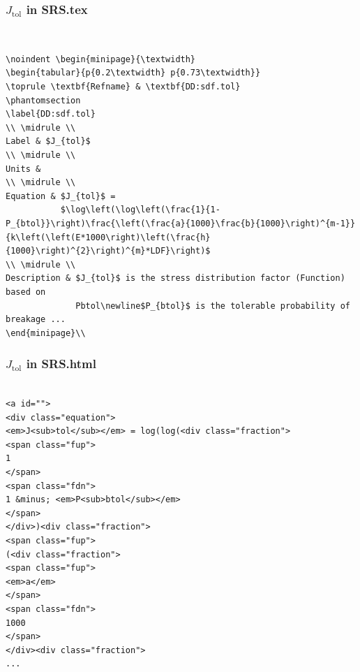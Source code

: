\documentclass[t,12pt,numbers,fleqn]{beamer}
\begin{document}

\begin{frame}

\frametitle{$J_{\mbox{tol}}$ in SRS.tex}
~\\
\begin{lstlisting}
\noindent \begin{minipage}{\textwidth}
\begin{tabular}{p{0.2\textwidth} p{0.73\textwidth}}
\toprule \textbf{Refname} & \textbf{DD:sdf.tol}
\phantomsection 
\label{DD:sdf.tol}
\\ \midrule \\
Label & $J_{tol}$
\\ \midrule \\
Units & 
\\ \midrule \\
Equation & $J_{tol}$ =
           $\log\left(\log\left(\frac{1}{1-P_{btol}}\right)\frac{\left(\frac{a}{1000}\frac{b}{1000}\right)^{m-1}}{k\left(\left(E*1000\right)\left(\frac{h}{1000}\right)^{2}\right)^{m}*LDF}\right)$
\\ \midrule \\
Description & $J_{tol}$ is the stress distribution factor (Function) based on
              Pbtol\newline$P_{btol}$ is the tolerable probability of breakage ...
\end{minipage}\\
\end{lstlisting}
\end{frame}


\begin{frame}

\frametitle{$J_{\mbox{tol}}$ in SRS.html}

\begin{lstlisting}

<a id="">
<div class="equation">
<em>J<sub>tol</sub></em> = log(log(<div class="fraction">
<span class="fup">
1
</span>
<span class="fdn">
1 &minus; <em>P<sub>btol</sub></em>
</span>
</div>)<div class="fraction">
<span class="fup">
(<div class="fraction">
<span class="fup">
<em>a</em>
</span>
<span class="fdn">
1000
</span>
</div><div class="fraction">
...
\end{lstlisting}

\end{frame}
\end{document}
